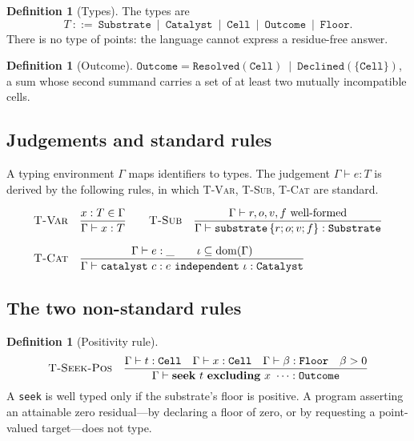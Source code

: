 \documentclass[11pt,a4paper]{article}
\theoremstyle{thmstyle}
\theoremstyle{definition}
\newtheorem{definition}[theorem]{Definition}
\theoremstyle{remark}
\newcommand{\flo}{\beta}
\newcommand{\Env}{\Gamma}
\newcommand{\seek}{\mathbf{seek}}
\newcommand{\excl}{\mathbf{excluding}}
\begin{document}
\begin{definition}[Types]
\label{def:types}
The types are
\[
T \ ::=\ \texttt{Substrate}\ \mid\ \texttt{Catalyst}\ \mid\ \texttt{Cell}\ \mid\ \texttt{Outcome}\ \mid\ \texttt{Floor}.
\]
There is no type of points: the language cannot express a residue-free
answer.
\end{definition}

\begin{definition}[Outcome]
\label{def:outcome}
$\texttt{Outcome}=\texttt{Resolved}(\texttt{Cell})\ \mid\
\texttt{Declined}(\{\texttt{Cell}\})$, a sum whose second summand carries a
set of at least two mutually incompatible cells.
\end{definition}

\subsection{Judgements and standard rules}

A typing environment $\Env$ maps identifiers to types. The judgement
$\Env\vdash e:T$ is derived by the following rules, in which
\textsc{T-Var}, \textsc{T-Sub}, \textsc{T-Cat} are standard.

\begin{align*}
&\textsc{T-Var}\quad
\frac{x:T\in\Env}{\Env\vdash x:T}
\qquad
\textsc{T-Sub}\quad
\frac{\Env\vdash r,o,v,f\ \text{well-formed}}
     {\Env\vdash \texttt{substrate}\,\{r;o;v;f\}:\texttt{Substrate}}\\[6pt]
&\textsc{T-Cat}\quad
\frac{\Env\vdash e:\_\qquad \iota\subseteq\mathrm{dom}(\Env)}
     {\Env\vdash \texttt{catalyst}\ c:e\ \texttt{independent}\ \iota:\texttt{Catalyst}}
\end{align*}

\subsection{The two non-standard rules}

\begin{definition}[Positivity rule]
\label{def:positivity}
\[
\textsc{T-Seek-Pos}\quad
\frac{\Env\vdash t:\texttt{Cell}\quad \Env\vdash x:\texttt{Cell}\quad
      \Env\vdash \flo:\texttt{Floor}\quad \flo>0}
     {\Env\vdash \seek\ t\ \excl\ x\ \dots:\texttt{Outcome}}
\]
A \texttt{seek} is well typed only if the substrate's floor is positive. A
program asserting an attainable zero residual---by declaring a floor of
zero, or by requesting a point-valued target---does not type.
\end{definition}
\end{document}
